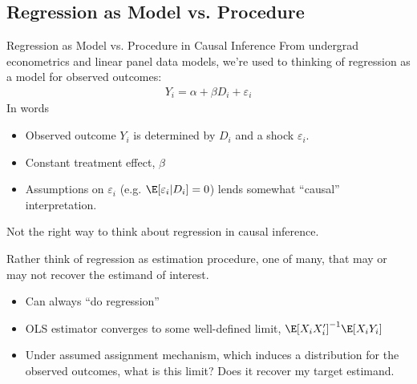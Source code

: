 \documentclass[aspectratio=169, handout]{beamer}
\begin{document}
\subsection{Regression as Model vs. Procedure}

{\footnotesize
\begin{frame}{Regression as Model vs. Procedure in Causal Inference}
From undergrad econometrics and linear panel data models, we're used to
thinking of \alert{regression as a model} for \alert{observed} outcomes:
\begin{align*}
  Y_i = \alpha + \beta D_i + \varepsilon_i
\end{align*}
\vspace{-10pt}
In words
\begin{itemize}
  \item Observed outcome $Y_i$ is determined by $D_i$ and a shock
    $\varepsilon_i$.
    \pause
  \item Constant treatment effect, $\beta$
    \pause
  \item Assumptions on $\varepsilon_i$ (e.g.
    $\E[\varepsilon_i|D_i]=0$) lends somewhat ``causal'' interpretation.
\end{itemize}
\pause
\alert{Not} the right way to think about regression in causal inference.

\pause
Rather think of \alert{regression as estimation procedure}, one of many,
that may or may not recover the estimand of interest.
\vspace{-5pt}
\begin{itemize}
  \item Can always ``do regression''
  \pause
  \item OLS estimator converges to some well-defined limit,
    $\E[X_iX_i']^{-1}\E[X_iY_i]$
  \pause
  \item Under assumed assignment mechanism, which induces a distribution
    for the observed outcomes, what is this limit?
    Does it recover my target estimand.
\end{itemize}
\end{frame}
}




\end{document}
